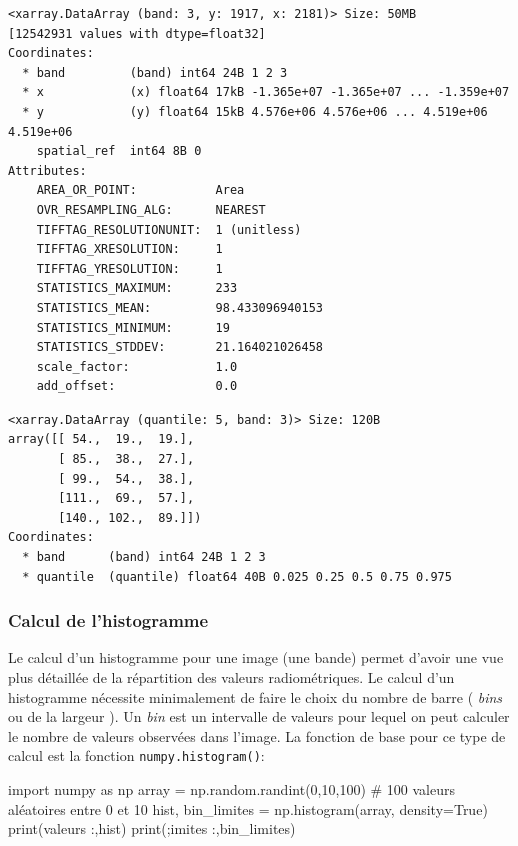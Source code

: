 \documentclass[
  11pt,
  letterpaper,
  open=any,
  twoside=false,
  french]{scrbook}
\newenvironment{Shaded}{\begin{snugshade}}{\end{snugshade}}
\newcommand{\BuiltInTok}[1]{\textcolor[rgb]{0.00,0.23,0.31}{#1}}
\newcommand{\CommentTok}[1]{\textcolor[rgb]{0.37,0.37,0.37}{#1}}
\newcommand{\DecValTok}[1]{\textcolor[rgb]{0.68,0.00,0.00}{#1}}
\newcommand{\ImportTok}[1]{\textcolor[rgb]{0.00,0.46,0.62}{#1}}
\newcommand{\NormalTok}[1]{\textcolor[rgb]{0.00,0.23,0.31}{#1}}
\newcommand{\OperatorTok}[1]{\textcolor[rgb]{0.37,0.37,0.37}{#1}}
\newcommand{\StringTok}[1]{\textcolor[rgb]{0.13,0.47,0.30}{#1}}
\newcommand{\VariableTok}[1]{\textcolor[rgb]{0.07,0.07,0.07}{#1}}
\begin{document}
\begin{verbatim}
<xarray.DataArray (band: 3, y: 1917, x: 2181)> Size: 50MB
[12542931 values with dtype=float32]
Coordinates:
  * band         (band) int64 24B 1 2 3
  * x            (x) float64 17kB -1.365e+07 -1.365e+07 ... -1.359e+07
  * y            (y) float64 15kB 4.576e+06 4.576e+06 ... 4.519e+06 4.519e+06
    spatial_ref  int64 8B 0
Attributes:
    AREA_OR_POINT:           Area
    OVR_RESAMPLING_ALG:      NEAREST
    TIFFTAG_RESOLUTIONUNIT:  1 (unitless)
    TIFFTAG_XRESOLUTION:     1
    TIFFTAG_YRESOLUTION:     1
    STATISTICS_MAXIMUM:      233
    STATISTICS_MEAN:         98.433096940153
    STATISTICS_MINIMUM:      19
    STATISTICS_STDDEV:       21.164021026458
    scale_factor:            1.0
    add_offset:              0.0
\end{verbatim}

\begin{verbatim}
<xarray.DataArray (quantile: 5, band: 3)> Size: 120B
array([[ 54.,  19.,  19.],
       [ 85.,  38.,  27.],
       [ 99.,  54.,  38.],
       [111.,  69.,  57.],
       [140., 102.,  89.]])
Coordinates:
  * band      (band) int64 24B 1 2 3
  * quantile  (quantile) float64 40B 0.025 0.25 0.5 0.75 0.975
\end{verbatim}

\subsubsection{Calcul de l'histogramme}\label{calcul-de-lhistogramme}

Le calcul d'un histogramme pour une image (une bande) permet d'avoir une
vue plus détaillée de la répartition des valeurs radiométriques. Le
calcul d'un histogramme nécessite minimalement de faire le choix du
nombre de barre ( \emph{bins} ou de la largeur ). Un \emph{bin} est un
intervalle de valeurs pour lequel on peut calculer le nombre de valeurs
observées dans l'image. La fonction de base pour ce type de calcul est
la fonction \texttt{numpy.histogram()}:

\begin{Shaded}
\begin{Highlighting}[]
\ImportTok{import}\NormalTok{ numpy }\ImportTok{as}\NormalTok{ np}
\NormalTok{array }\OperatorTok{=}\NormalTok{ np.random.randint(}\DecValTok{0}\NormalTok{,}\DecValTok{10}\NormalTok{,}\DecValTok{100}\NormalTok{) }\CommentTok{\# 100 valeurs aléatoires entre 0 et 10}
\NormalTok{hist, bin\_limites }\OperatorTok{=}\NormalTok{ np.histogram(array, density}\OperatorTok{=}\VariableTok{True}\NormalTok{)}
\BuiltInTok{print}\NormalTok{(}\StringTok{\textquotesingle{}valeurs :\textquotesingle{}}\NormalTok{,hist)}
\BuiltInTok{print}\NormalTok{(}\StringTok{\textquotesingle{};imites :\textquotesingle{}}\NormalTok{,bin\_limites)}
\end{Highlighting}
\end{Shaded}
\end{document}

